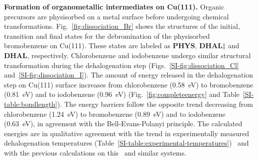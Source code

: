 \documentclass[aps,prb,reprint,amsmath,amssymb]{revtex4-1}
\newcommand{\lock}{\color{red}}
\newcommand{\lock}{\color{black}}
\newcommand{\comm}{\color{green}} %
\newcommand{\sinfo}{Supporting Information}
\begin{document}
{\lock

\textbf{Formation of organometallic intermediates on Cu(111).} Organic precursors are physisorbed on a metal surface before undergoing chemical transformations. 
%
Fig.~\ref{fig:dissociation_Br} shows the structures of the initial, transition and final states for the debromination of the physisorbed bromobenzene on Cu(111). These states are labeled as \textbf{PHYS}, \textbf{DHAL$\ddagger$} and \textbf{DHAL}, respectively. Chlorobenzene and iodobenzene undergo similar structural transformation during the dehalogenation step (Figs.~\ref{SI-fig:dissociation_Cl} and~\ref{SI-fig:dissociation_I}).
%
%
The amount of energy released in the dehalogenation step on Cu(111) surface increases from chlorobenzene (\SI{0.58}{\electronvolt}) to bromobenzene (\SI{0.81}{\electronvolt}) and to iodobenzene (\SI{0.96}{\electronvolt}) (Fig.~\ref{fig:completeenergy} and Table~\ref{SI-table:bondlength}).
The energy barriers follow the opposite trend decreasing from chlorobenzene (\SI{1.24}{\electronvolt}) to bromobenzene (\SI{0.89}{\electronvolt}) and to iodobenzene (\SI{0.63}{\electronvolt}), in agreement with the Bell-Evans-Polanyi principle.
The calculated energies are in qualitative agreement with the trend in experimentally measured dehalogenation temperatures (Table~\ref{SI-table:experimental-temperatures})~\cite{ullmann_52,ullmann_87,ullmann_67} and with the previous calculations on this~\cite{jacs2013} and similar systems.

}
\end{document}
